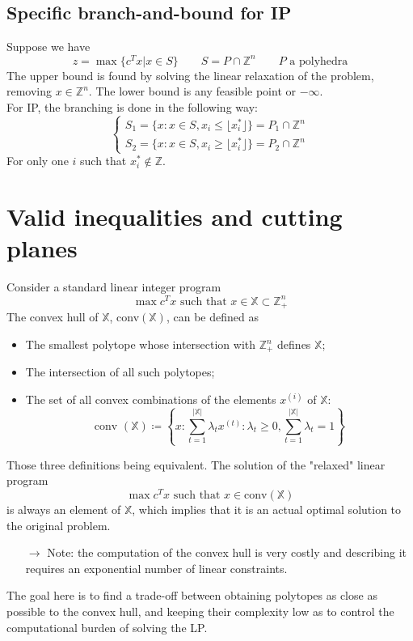 \documentclass[11pt, openany]{report}
\theoremstyle{definition}
\begin{document}
\section{Specific branch-and-bound for IP}
Suppose we have 
\begin{equation}
    z = \max\{ c^Tx |x\in S\} \qquad S = P\cap \mathbb{Z}^n \qquad P\text{ a polyhedra}
\end{equation}
The upper bound is found by solving the linear relaxation of the problem, removing $x\in \mathbb{Z}^n$. The lower bound is any feasible point or $-\infty$. \\
For IP, the branching is done in the following way:
\begin{equation}
    \begin{cases}
        S_1 = \{x:x\in S, x_i \le \lfloor x_i^* \rfloor \} = P_1 \cap \mathbb{Z}^n\\
        S_2 = \{x:x\in S, x_i \ge \lfloor x_i^* \rfloor \} = P_2 \cap \mathbb{Z}^n
    \end{cases}
\end{equation}
For only one $i$ such that $x_i^* \not \in \mathbb{Z}$. 
\chapter{Valid inequalities and cutting planes}
Consider a standard linear integer program 
\begin{equation}
    \max c^Tx \text{ such that } x\in \mathbb{X}\subset \mathbb{Z}_+^n
\end{equation}
The convex hull of $\mathbb{X}$, conv$(\mathbb{X})$, can be defined as 
\begin{itemize}
    \item The smallest polytope whose intersection with $\mathbb{Z}_+^n$ defines $\mathbb{X}$;
    \item The intersection of all such polytopes;
    \item The set of all convex combinations of the elements $x^{(i)}$ of $\mathbb{X}$:
    \begin{equation}
        \text{conv }(\mathbb{X}) \coloneqq \left\{ x:\sum_{t=1}^{|\mathbb{X}|}\lambda_tx^{(t)} : \lambda_t \ge0,\sum_{t=1}^{|\mathbb{X}|}\lambda_t=1 \right\}
    \end{equation}
\end{itemize}
Those three definitions being equivalent. The solution of the "relaxed" linear program 
\begin{equation}
    \max c^Tx \text{ such that } x\in \text{conv}(\mathbb{X})
\end{equation}
is always an element of $\mathbb{X}$, which implies that it is an actual optimal solution to the original problem. 
\begin{itemize}
    \item [$\rightarrow$] Note: the computation of the convex hull is very costly and describing it requires an exponential number of linear constraints. 
\end{itemize}
The goal here is to find a trade-off between obtaining polytopes as close as possible to the convex hull, and keeping their complexity low as to control the computational burden of solving the LP. 
\end{document}
